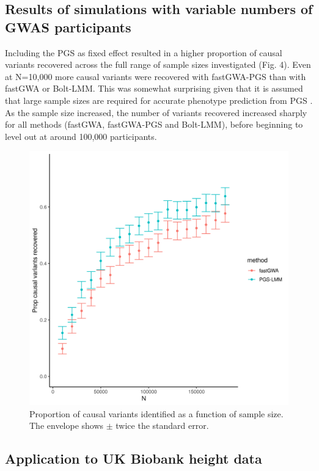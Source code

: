 \documentclass[fleqn,10pt]{wlscirep}
\begin{document}
\subsection*{Results of simulations with variable numbers of GWAS participants}
Including the PGS as fixed effect resulted in a higher proportion of causal variants recovered across the full range of sample sizes investigated (Fig. 4). Even at N=10,000 more causal variants were recovered with fastGWA-PGS than with fastGWA or Bolt-LMM. This was somewhat surprising given that it is assumed that large sample sizes are required for accurate phenotype prediction from PGS \cite{dudbridge2013power}. As the sample size increased, the number of variants recovered increased sharply for all methods (fastGWA, fastGWA-PGS and Bolt-LMM), before beginning to level out at around 100,000 participants. \par

\begin{figure}
\centering
\includegraphics[width=120mm]{images/Fig4}
\caption{Proportion of causal variants identified as a function of sample size. The envelope shows $\pm$ twice the standard error.}
\label{fig: Effects of sample size}
\end{figure}

\subsection*{Application to UK Biobank height data} 
\end{document}
